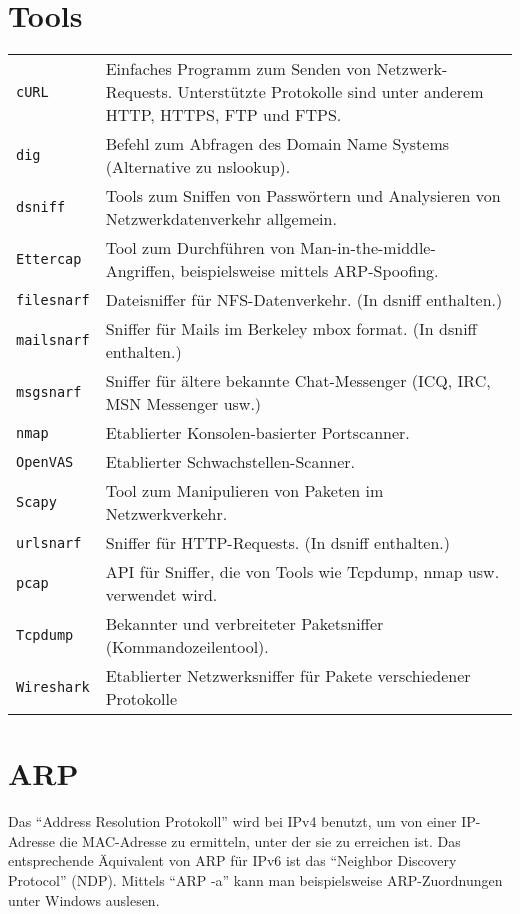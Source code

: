 \begin{multicols}{3}
\section{Tools}
\begin{tabular}{@{}p{\the\MyLen}
		@{}p{\linewidth-\the\MyLen}@{}}
	\texttt{cURL} & Einfaches Programm zum Senden von Netzwerk-Requests. Unterstützte Protokolle sind unter anderem HTTP, HTTPS, FTP und FTPS.\\
	\texttt{dig} & Befehl zum Abfragen des Domain Name Systems (Alternative zu nslookup).\\
	\texttt{dsniff} & Tools zum Sniffen von Passwörtern und Analysieren von Netzwerkdatenverkehr allgemein.\\
	\texttt{Ettercap} & Tool zum Durchführen von Man-in-the-middle-Angriffen, beispielsweise mittels ARP-Spoofing.\\
	\texttt{filesnarf} & Dateisniffer für NFS-Datenverkehr. (In dsniff enthalten.)\\
	\texttt{mailsnarf} & Sniffer für Mails im Berkeley mbox format. (In dsniff enthalten.)\\
	\texttt{msgsnarf} & Sniffer für ältere bekannte Chat-Messenger (ICQ, IRC, MSN Messenger usw.)\\
	\texttt{nmap} & Etablierter Konsolen-basierter Portscanner.\\
	\texttt{OpenVAS} & Etablierter Schwachstellen-Scanner.\\
	\texttt{Scapy} & Tool zum Manipulieren von Paketen im Netzwerkverkehr.\\
	\texttt{urlsnarf} & Sniffer für HTTP-Requests. (In dsniff enthalten.)\\
	\texttt{pcap} & API für Sniffer, die von Tools wie Tcpdump, nmap usw. verwendet wird.\\
	\texttt{Tcpdump} & Bekannter und verbreiteter Paketsniffer (Kommandozeilentool).\\
	\texttt{Wireshark} & Etablierter Netzwerksniffer für Pakete verschiedener Protokolle\\
\end{tabular}
\section{ARP}
Das \enquote{Address Resolution Protokoll} wird bei IPv4 benutzt, um von einer IP-Adresse die MAC-Adresse zu ermitteln, unter der sie zu erreichen ist. Das entsprechende Äquivalent von ARP für IPv6 ist das \enquote{Neighbor Discovery Protocol} (NDP). Mittels \enquote{ARP -a} kann man beispielsweise ARP-Zuordnungen unter Windows auslesen.

\end{multicols}
